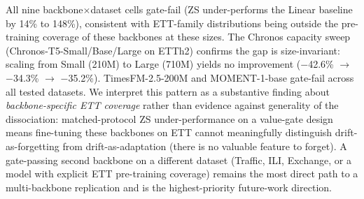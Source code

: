 All nine backbone$\times$dataset cells gate-fail (ZS under-performs
the Linear baseline by 14\% to 148\%), consistent with ETT-family
distributions being outside the pre-training coverage of these
backbones at these sizes.  The Chronos capacity sweep
(Chronos-T5-Small/Base/Large on ETTh2) confirms the gap is
size-invariant: scaling from Small (210M) to Large (710M)
yields no improvement ($-$42.6\% $\to$ $-$34.3\% $\to$ $-$35.2\%).
TimesFM-2.5-200M and MOMENT-1-base gate-fail across all tested datasets.
We interpret this pattern as a substantive finding about
\emph{backbone-specific ETT coverage} rather than evidence against
generality of the dissociation: matched-protocol ZS under-performance
on a value-gate design means fine-tuning these backbones on ETT
cannot meaningfully distinguish drift-as-forgetting from
drift-as-adaptation (there is no valuable feature to forget).  A
gate-passing second backbone on a different dataset (Traffic, ILI,
Exchange, or a model with explicit ETT pre-training coverage)
remains the most direct path to a multi-backbone replication and
is the highest-priority future-work direction.

